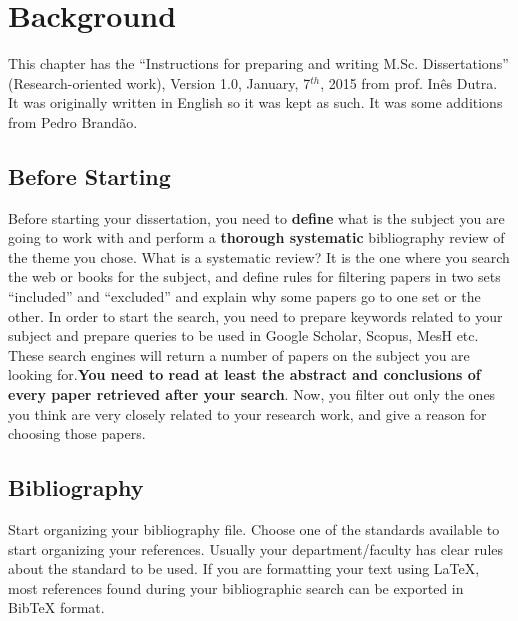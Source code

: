 \chapter{Background}\label{chap:back}

This chapter has the ``Instructions for preparing and writing M.Sc. Dissertations'' (Research-oriented work), 
Version 1.0, January, 7$^{th}$, 2015 from prof. Inês Dutra. It was originally written in English so it was kept as such. It was some additions from Pedro Brandão.

\section{Before Starting}
Before starting your dissertation, you need to \textbf{define} what is the subject you are going to work
with and perform a \textbf{thorough systematic} bibliography review of the theme you chose.
What is a systematic review? It is the one where you search the web or books for the subject, and
define rules for filtering papers in two sets “included” and “excluded” and explain why some papers
go to one set or the other.
In order to start the search, you need to prepare keywords related to your subject and prepare
queries to be used in Google Scholar, Scopus, MesH etc. These search engines will return a number
of papers on the subject you are looking for.\textbf{You need to read at least the abstract and 
conclusions of every paper retrieved after your search}. Now, you filter out only the ones you
think are very closely related to your research work, and give a reason for choosing those papers.

\section{Bibliography}
 Start organizing your bibliography file. Choose one of the standards available to start organizing
your references. Usually your department/faculty has clear rules about the standard to be used. If
you are formatting your text using \LaTeX, most references found during your bibliographic search
can be exported in BibTeX format.

